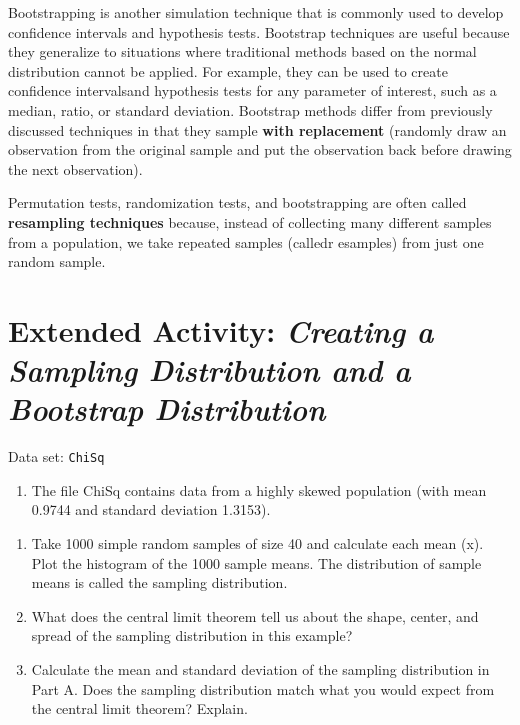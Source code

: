 \documentclass[
]{report}
\providecommand{\tightlist}{%
  \setlength{\itemsep}{0pt}\setlength{\parskip}{0pt}}
\begin{document}
Bootstrapping is another simulation technique that is commonly used to develop confidence intervals and hypothesis tests. Bootstrap techniques are useful because they generalize to situations where traditional methods based on the normal distribution cannot be applied. For example, they can be used to create confidence intervalsand hypothesis tests for any parameter of interest, such as a median, ratio, or standard deviation. Bootstrap methods differ from previously discussed techniques in that they sample \textbf{with replacement} (randomly draw
an observation from the original sample and put the observation back before drawing the next observation).

Permutation tests, randomization tests, and bootstrapping are often called \textbf{resampling techniques} because, instead of collecting many different samples from a population, we take repeated samples (calledr esamples) from just one random sample.

\hypertarget{extended-activity-creating-a-sampling-distribution-and-a-bootstrap-distribution}{%
\section*{\texorpdfstring{Extended Activity: \emph{Creating a Sampling Distribution and a Bootstrap Distribution}}{Extended Activity: Creating a Sampling Distribution and a Bootstrap Distribution}}\label{extended-activity-creating-a-sampling-distribution-and-a-bootstrap-distribution}}

Data set: \texttt{ChiSq}

\begin{enumerate}
\def\labelenumi{\arabic{enumi}.}
\setcounter{enumi}{20}
\tightlist
\item
  The file ChiSq contains data from a highly skewed population (with mean 0.9744 and standard
  deviation 1.3153).
\end{enumerate}

\begin{enumerate}
\def\labelenumi{\alph{enumi}.}
\item
  Take 1000 simple random samples of size 40 and calculate each mean (x). Plot the histogram of the 1000 sample means. The distribution of sample means is called the sampling distribution.
\item
  What does the central limit theorem tell us about the shape, center, and spread of the sampling distribution in this example?
\item
  Calculate the mean and standard deviation of the sampling distribution in Part A. Does the sampling distribution match what you would expect from the central limit theorem? Explain.
\end{enumerate}
\end{document}
